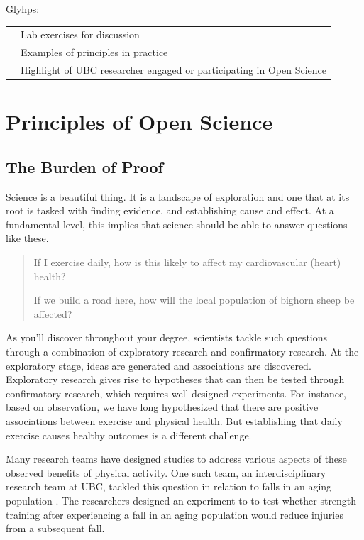 \documentclass[
]{book}
\begin{document}
Glyhps:

\begin{longtable}[]{@{}ll@{}}
\toprule
\endhead
& Lab exercises for discussion \\
& Examples of principles in practice \\
& Highlight of UBC researcher engaged or participating in Open Science \\
\bottomrule
\end{longtable}

\hypertarget{principles-of-open-science}{%
\chapter{Principles of Open Science}\label{principles-of-open-science}}

\hypertarget{the-burden-of-proof}{%
\section{The Burden of Proof}\label{the-burden-of-proof}}

Science is a beautiful thing. It is a landscape of exploration and one that at its root is tasked with finding evidence, and establishing cause and effect. At a fundamental level, this implies that science should be able to answer questions like these.

\begin{quote}
If I exercise daily, how is this likely to affect my cardiovascular (heart) health?

If we build a road here, how will the local population of bighorn sheep be affected?
\end{quote}

As you'll discover throughout your degree, scientists tackle such questions through a combination of exploratory research and confirmatory research. At the exploratory stage, ideas are generated and associations are discovered. Exploratory research gives rise to hypotheses that can then be tested through confirmatory research, which requires well-designed experiments. For instance, based on observation, we have long hypothesized that there are positive associations between exercise and physical health. But establishing that daily exercise causes healthy outcomes is a different challenge.

Many research teams have designed studies to address various aspects of these observed benefits of physical activity. One such team, an interdisciplinary research team at UBC, tackled this question in relation to falls in an aging population \citep{liu-ambrose_effect_2019}. The researchers designed an experiment to to test whether strength training after experiencing a fall in an aging population would reduce injuries from a subsequent fall.
\end{document}
